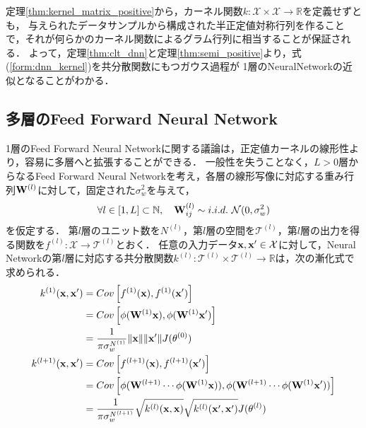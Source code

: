 \documentclass[11pt,a4j]{article}
\begin{document}
        定理\ref{thm:kernel_matrix_positive}から，カーネル関数$k: \mathcal{X} \times \mathcal{X} \to \mathbb{R}$を定義せずとも，
        与えられたデータサンプルから構成された半正定値対称行列を作ることで，それが何らかのカーネル関数によるグラム行列に相当することが保証される．
        よって，定理\ref{thm:clt_dnn}と定理\ref{thm:semi_positive}より，式(\ref{form:dnn_kernel})を共分散関数にもつガウス過程が
        1層のNeuralNetworkの近似となることがわかる．

    \subsection{多層のFeed Forward Neural Network}
      1層のFeed Forward Neural Networkに関する議論は，正定値カーネルの線形性より，容易に多層へと拡張することができる．
      一般性を失うことなく，$L > 0$層からなるFeed Forward Neural Networkを考え，各層の線形写像に対応する重み行列${\bf W}^{(l)}$に対して，固定された$\sigma^2_w$を与えて，
      \begin{align}
        \forall l \in [1, L] \subset \mathbb{N}, ~~~ {\bf W}^{(l)}_{ij} \sim i.i.d. ~ \mathcal{N}(0, \sigma^2_w)
      \end{align}
      を仮定する．
      第$l$層のユニット数を$N^{(l)}$，第$l$層の空間を$\mathcal{T}^{(l)}$，第$l$層の出力を得る関数を$f^{(l)}: \mathcal{X} \to \mathcal{T}^{(l)}$とおく．
      任意の入力データ${\bf x}, {\bf x}' \in \mathcal{X}$に対して，Neural Networkの第$l$層に対応する共分散関数$k^{(l)}: \mathcal{T}^{(l)} \times \mathcal{T}^{(l)} \to \mathbb{R}$は，次の漸化式で求められる．
      \begin{align}
        k^{(1)}({\bf x}, {\bf x}') &= Cov \left[ f^{(1)}({\bf x}), f^{(1)}({\bf x}') \right] \nonumber \\
                                   &= Cov \left[ \phi({\bf W}^{(1)} {\bf x}), \phi({\bf W}^{(1)} {\bf x}') \right] \nonumber \\ 
                                   &= \frac{1}{\pi \sigma_w^{N^{(1)}}} \| {\bf x} \| \| {\bf x}' \| J(\theta^{(0)}) \\
        k^{(l+1)}({\bf x}, {\bf x}') &= Cov \left[ f^{(l+1)}({\bf x}), f^{(l+1)}({\bf x}') \right] \nonumber \\
                                     &= Cov \left[ \phi( {\bf W}^{(l+1)} \cdots \phi( {\bf W}^{(1)} {\bf x} )), \phi( {\bf W}^{(l+1)} \cdots \phi( {\bf W}^{(1)} {\bf x}' )) \right] \nonumber \\ 
                                     &= \frac{1}{ \pi \sigma_{w}^{ N^{(l+1)}}} \sqrt{ k^{(l)}({\bf x}, {\bf x}) } \sqrt{ k^{(l)}({\bf x}', {\bf x}') } J(\theta^{(l)})
      \end{align}
\end{document}
